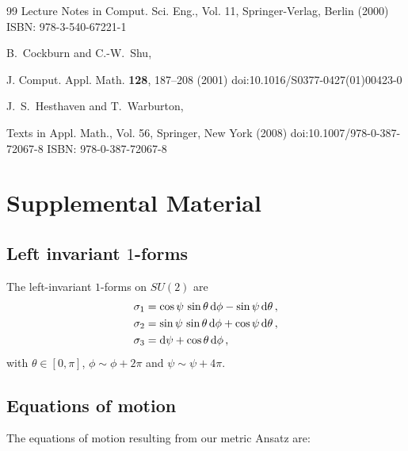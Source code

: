 \documentclass[prl,twocolumn,superscriptaddress,nofootinbib]{revtex4-2}
\makeatletter
\renewcommand\onecolumngrid{
\do@columngrid{one}{\@ne}
\def\set@footnotewidth{\onecolumngrid}
\def\footnoterule{\kern-6pt\hrule width 1.5in\kern6pt}
}
\makeatother
\begin{document}
\begin{thebibliography}{99}
Lecture Notes in Comput. Sci. Eng., Vol. 11, Springer-Verlag, Berlin (2000)
ISBN: 978-3-540-67221-1


B.~Cockburn and C.-W.~Shu,

J. Comput. Appl. Math. \textbf{128}, 187--208 (2001)
doi:10.1016/S0377-0427(01)00423-0


J.~S.~Hesthaven and T.~Warburton,

Texts in Appl. Math., Vol. 56, Springer, New York (2008)
doi:10.1007/978-0-387-72067-8
ISBN: 978-0-387-72067-8

\end{thebibliography}

\onecolumngrid
\section{Supplemental Material}

\subsection{Left invariant $1$-forms}

The left-invariant $1$-forms on $SU(2)$ are
\begin{equation}
\begin{aligned}
&\sigma_1 = \cos \psi\,\sin \theta\,{\rm d}\phi-\sin \psi\,{\rm d}\theta\,,
\\
&\sigma_2 = \sin \psi\,\sin \theta\, {\rm d}\phi+\cos \psi\,{\rm d}\theta\,,
\\
&\sigma_3={\rm d}\psi+\cos \theta \,{\rm d}\phi\,,
\end{aligned}
\end{equation}
with $\theta\in[0,\pi]$, $\phi\sim \phi+2\pi$ and $\psi\sim \psi+4\pi$.

\subsection{Equations of motion}

The equations of motion resulting from our metric Ansatz are:
\end{document}
